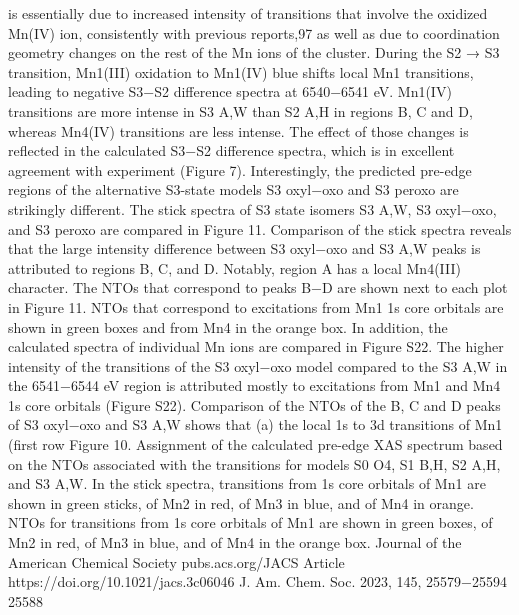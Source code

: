 \documentclass{article}
\begin{document}
\newpage


is essentially due to increased intensity of transitions that
involve the oxidized Mn(IV) ion, consistently with previous
reports,97 as well as due to coordination geometry changes on
the rest of the Mn ions of the cluster.
During the S2 → S3 transition, Mn1(III) oxidation to
Mn1(IV) blue shifts local Mn1 transitions, leading to negative
S3−S2 difference spectra at 6540−6541 eV. Mn1(IV)
transitions are more intense in S3
A,W than S2
A,H in regions B,
C and D, whereas Mn4(IV) transitions are less intense. The
effect of those changes is reflected in the calculated S3−S2
difference spectra, which is in excellent agreement with
experiment (Figure 7). Interestingly, the predicted pre-edge
regions of the alternative S3-state models S3
oxyl−oxo and S3
peroxo
are strikingly different.
The stick spectra of S3 state isomers S3
A,W, S3
oxyl−oxo, and
S3
peroxo are compared in Figure 11. Comparison of the stick
spectra reveals that the large intensity difference between
S3
oxyl−oxo and S3
A,W peaks is attributed to regions B, C, and D.
Notably, region A has a local Mn4(III) character. The NTOs
that correspond to peaks B−D are shown next to each plot in
Figure 11. NTOs that correspond to excitations from Mn1 1s
core orbitals are shown in green boxes and from Mn4 in the
orange box. In addition, the calculated spectra of individual Mn
ions are compared in Figure S22. The higher intensity of the
transitions of the S3
oxyl−oxo model compared to the S3
A,W in the
6541−6544 eV region is attributed mostly to excitations from
Mn1 and Mn4 1s core orbitals (Figure S22). Comparison of
the NTOs of the B, C and D peaks of S3
oxyl−oxo and S3
A,W
shows that (a) the local 1s to 3d transitions of Mn1 (first row
Figure 10. Assignment of the calculated pre-edge XAS spectrum based on the NTOs associated with the transitions for models S0
O4, S1
B,H, S2
A,H,
and S3
A,W. In the stick spectra, transitions from 1s core orbitals of Mn1 are shown in green sticks, of Mn2 in red, of Mn3 in blue, and of Mn4 in
orange. NTOs for transitions from 1s core orbitals of Mn1 are shown in green boxes, of Mn2 in red, of Mn3 in blue, and of Mn4 in the orange box.
Journal of the American Chemical Society
pubs.acs.org/JACS
Article
https://doi.org/10.1021/jacs.3c06046
J. Am. Chem. Soc. 2023, 145, 25579−25594
25588

\newpage

\end{document}
